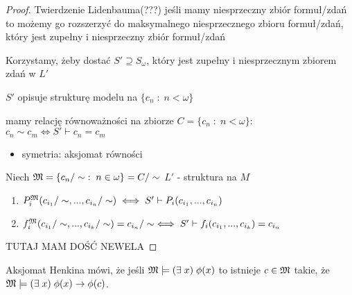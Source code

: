 \begin{proof}
  Twierdzenie Lidenbauma(???) jeśli mamy niesprzeczny zbiór formuł/zdań to możemy go rozszerzyć do maksymalnego niesprzecznego zbioru formuł/zdań, który jest zupełny i niesprzeczny zbiór formuł/zdań
  
  Korzystamy, żeby dostać $S'\supseteq S_\omega$, który jest zupełny i niesprzecznym zbiorem zdań w $L'$

  $S'$ opisuje strukturę modelu na $\{c_n\;:\;n<\omega\}$

  mamy relację równoważności na zbiorze $C=\{c_n\;:\;n<\omega\}$: $c_n\sim c_m\iff S'\vdash c_n=c_m$
  \begin{itemize}
    \item symetria: aksjomat równości
  \end{itemize}

  Niech $\mathfrak{M}=\{c_n/\sim\;:\;n\in\omega\}=C/\sim$
  $L'$ - struktura na $M$
  \begin{enumerate}
    \item $P_i^{\mathfrak{M}}(c_{i_1}/\sim,...,c_{i_n}/\sim)\iff S'\vdash P_i(c_{i_1},...,c_{i_n})$
    \item $f^{\mathfrak{M}}_i(c_{i_1}/\sim,...,c_{i_k}/\sim)=c_{i_n}/\sim\iff S'\vdash f_i(c_{i_1},..., c_{i_k})=c_{i_n}$
  \end{enumerate}

  {\color{red}TUTAJ MAM DOŚĆ NEWELA}
\end{proof}


Aksjomat Henkina mówi, że jeśli $\mathfrak{M}\models (\exists\;x)\;\phi(x)$ to istnieje $c\in \mathfrak{M}$ takie, że $\mathfrak{M}\models(\exists\;x)\;\phi(x)\to\phi(c)$.






